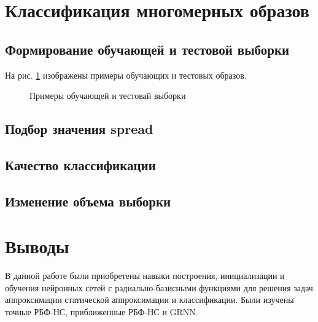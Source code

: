 \newpage

\section{Классификация многомерных образов}

\subsection{Формирование обучающей и тестовой выборки}


На рис. \ref{fig:5_1} изображены примеры обучающих и тестовых образов.
\begin{figure}[H]
\begin{center}
	\caption{Примеры обучающей и тестовай выборки}
	\label{fig:5_1}
\end{center}
\end{figure}

\subsection{Подбор значения spread}


\subsection{Качество классификации}


\subsection{Изменение объема выборки}


\section{Выводы}

В данной работе были приобретены навыки построения, инициализации и обучения нейронных сетей с радиально-базисными функциями для решения задач аппроксимации статической аппроксимации и классификации. Были изучены точные РБФ-НС, приближенные РБФ-НС и GRNN.

